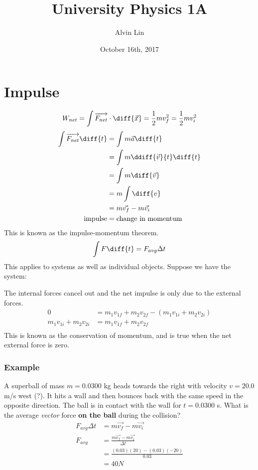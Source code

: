\documentclass[letterpaper, 12pt]{math}
\title{University Physics 1A}
\author{Alvin Lin}
\date{October 16th, 2017}
\begin{document}
\maketitle

\section*{Impulse}
\[ W_{net} = \int\overrightarrow{F_{net}}\cdot\diff{\vec{x}} =
  \frac{1}{2}mv_f^2 = \frac{1}{2}mv_i^2 \]
\begin{align*}
  \int\overrightarrow{F_{net}}\diff{t} &= \int m\vec{a}\diff{t} \\
  &= \int m\ddiff{\vec{v}}{t}\diff{t} \\
  &= \int m\diff{\vec{v}} \\
  &= m\int\diff{v} \\
  &= m\vec{v_f}-m\vec{v_i} \\
  \text{impulse} &= \text{change in momentum}
\end{align*}
This is known as the impulse-momentum theorem.
\[ \int F\diff{t} = F_{avg}\Delta{t} \]
This applies to systems as well as individual objects. Suppose we have the
system:
\begin{center}
\end{center}
The internal forces cancel out and the net impulse is only due to the external
forces.
\begin{align*}
  0 &= m_1v_{1f}+m_2v_{2f}-(m_1v_{1i}+m_2v_{2i}) \\
  m_1v_{1i}+m_2v_{2i} &= m_1v_{1f}+m_2v_{2f} \\
\end{align*}
This is known as the conservation of momentum, and is true when the net
external force is zero.

\subsubsection*{Example}
A superball of mass \( m = 0.0300 \) kg heads towards the right with velocity
\( v = 20.0 \) m/s west (?). It hits a wall and then bounces back with the same
speed in the opposite direction. The ball is in contact with the wall for
\( t = 0.0300 \) s. What is the average \textit{vector} force \textbf{on the
ball} during the collision?
\begin{align*}
  F_{avg}\Delta{t} &= m\vec{v_f}-m\vec{v_i} \\
  F_{avg} &= \frac{m\vec{v_f}-m\vec{v_i}}{\Delta{t}} \\
  &= \frac{(0.03)(20)-(0.03)(-20)}{0.03} \\
  &= 40N
\end{align*}
\end{document}
